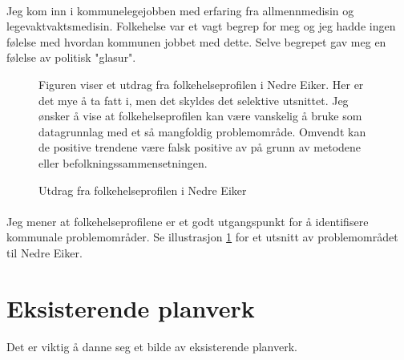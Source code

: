 \documentclass[11pt]{memoir} %
\begin{document}
		\paragraph{}
			Jeg kom inn i kommunelegejobben med erfaring fra allmennmedisin og legevaktvaktsmedisin. Folkehelse var et vagt begrep for meg og jeg hadde ingen følelse med hvordan kommunen jobbet med dette. Selve begrepet gav meg en følelse av politisk "glasur". 

                    \begin{figure}[h]
                      \centering
                      \captionsetup{singlelinecheck=off}
                      \caption{Utdrag fra folkehelseprofilen i Nedre Eiker}
                      {Figuren viser et utdrag fra folkehelseprofilen i Nedre Eiker. Her er det mye å ta fatt i, men det skyldes det selektive utsnittet. Jeg ønsker å vise at folkehelseprofilen kan være vanskelig å bruke som datagrunnlag med et så mangfoldig problemområde. Omvendt kan de positive trendene være falsk positive av på grunn av metodene eller befolkningssammensetningen.\cite{fhprofil}}\label{fhprofilnekbilde}%
                    \end{figure}    

		\paragraph{}	
			Jeg mener at folkehelseprofilene er et godt utgangspunkt for å identifisere kommunale problemområder. Se illustrasjon \ref{fhprofilnekbilde} for et utsnitt av problemområdet til Nedre Eiker.
		
	\section{Eksisterende planverk}
		\paragraph{}
			Det er viktig å danne seg et bilde av eksisterende planverk.
\end{document}
